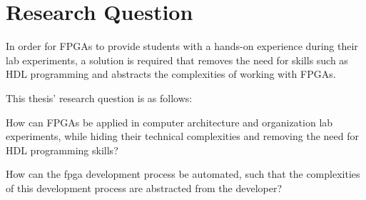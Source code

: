 \documentclass[main.tex]{subfiles}
\begin{document}
\section{Research Question}

In order for FPGAs to provide students with a hands-on experience during their lab experiments, a solution is required 
that removes the need for skills such as HDL programming and abstracts the complexities of working with FPGAs.

This thesis' research question is as follows: 

\begin{displayquote}
How can FPGAs be applied in computer architecture and organization lab experiments, while hiding their technical complexities and removing the need for HDL programming skills?
\end{displayquote}

How can the fpga development process be automated, such that the complexities of this development process are abstracted from the developer?
\end{document}
